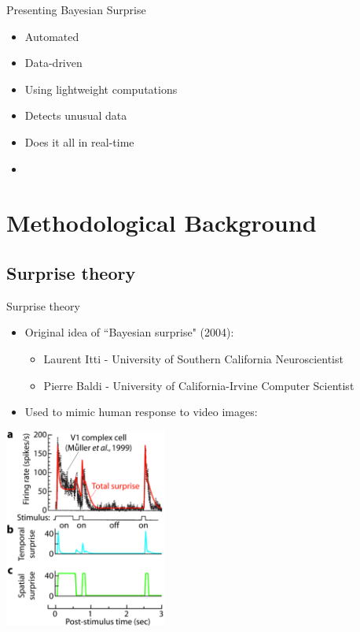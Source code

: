 \documentclass{beamer}
\begin{document}
\begin{frame}{Presenting Bayesian Surprise}
	\begin{itemize}
		\item Automated
		\item Data-driven
		\item Using lightweight computations
		\item Detects unusual data
		\item Does it all in real-time
		\item {}
	\end{itemize}
\end{frame}



\section{Methodological Background}


\subsection{Surprise theory}


\begin{frame}{Surprise theory}
	\begin{itemize}
		\item Original idea of ``Bayesian surprise" (2004):
		\begin{itemize}
			\item Laurent Itti - University of Southern California Neuroscientist
			\item Pierre Baldi - University of California-Irvine Computer Scientist
		\end{itemize}
		\item Used to mimic human response to video images:
	\end{itemize}
	\vspace{-1mm}
	\begin{center}
		\includegraphics[width=0.4\textwidth]{../../figures/surprise-ittibaldi}
	\end{center}
\end{frame}
\end{document}
